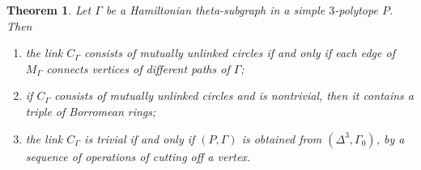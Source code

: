 \documentclass[12pt]{amsart}
\newtheorem{theorem}[formula]{Theorem}
\theoremstyle{definition}
\theoremstyle{remark}
\begin{document}
\begin{theorem}\label{Th:unl}
Let $\Gamma$ be a Hamiltonian theta-subgraph in a simple $3$-polytope $P$. Then 
\begin{enumerate}
\item the link $C_\Gamma$ consists of mutually unlinked circles if and only if each edge of $M_{\Gamma}$
connects vertices of different paths of $\Gamma$;
\item if $C_\Gamma$ consists of mutually unlinked circles and is nontrivial, then it contains 
a triple of Borromean rings; 
\item the link $C_\Gamma$ is trivial if and only if  $(P,\Gamma)$ is obtained from $(\Delta^3,\Gamma_0)$,
by a sequence of operations of cutting off a vertex.
\end{enumerate}
\end{theorem}
\end{document}
